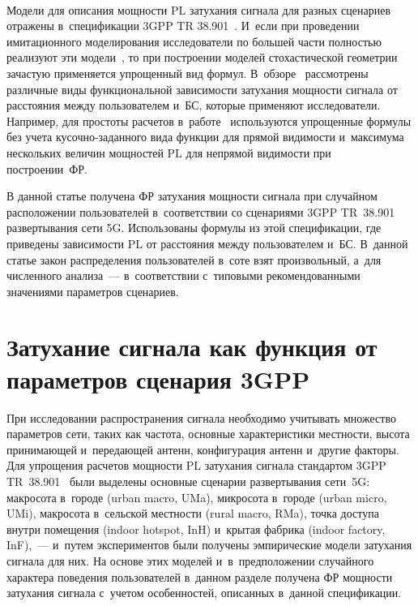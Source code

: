 \begin{multicols}{2}
\begin{figure*}[b] %
\vspace*{-6pt}
      \begin{center}
     \mbox{%
\epsfxsize=124.62mm 
}
\end{center}
\vspace*{-9pt}
\label{fig1}
\end{figure*}

Модели для описания мощности $\mathrm{PL}$ затухания сигнала для разных сценариев 
отражены в~спецификации 3GPP TR 38.901~\cite{3GPP38901}. И~если при проведении 
имитационного моделирования исследователи по большей части полностью реализуют 
эти модели~\cite{Bolla2023}, то при построении моделей стохастической гео\-мет\-рии 
зачастую применяется упрощенный вид формул.
В~обзоре~\cite{Hmamouche2021} рассмотрены различные виды функциональной 
зависимости затухания мощ\-ности сигнала от расстояния между пользователем 
и~БС, которые применяют исследователи. Например, для простоты 
расчетов в~работе~\cite{Moltchanov2022b} используются упрощенные формулы без 
учета ку\-соч\-но-за\-дан\-но\-го вида функции для прямой видимости и~максимума нескольких 
величин мощностей PL для непрямой видимости при по\-стро\-ении~ФР.

В данной статье получена ФР затухания мощ\-ности сигнала при случайном 
расположении пользователей в~соответствии со сценариями 3GPP TR~38.901 
развертывания сети 5G. Использованы формулы из этой спецификации, где приведены 
зависимости PL от расстояния между пользователем и~БС. В~данной 
статье закон распределения пользователей в~соте взят произвольный, а~для 
численного анализа~--- в~соответствии с~типовыми рекомендованными значениями 
параметров сценариев.



\section{Затухание сигнала как функция от параметров сценария 3GPP} \label{sec2}

При исследовании распространения сигнала необходимо учитывать множество 
параметров сети, таких как частота, основные характеристики местности, высота 
принимающей и~передающей антенн, конфигурация антенн и~другие факторы. Для 
упрощения расчетов мощности PL затухания сигнала стандартом 3GPP TR~38.901~\cite{3GPP38901} 
были выделены основные сценарии развертывания сети~5G: 
мак\-ро\-со\-та в~городе (urban macro, UMa), микросота в~городе (urban micro, UMi), 
мак\-ро\-со\-та в~сельской местности (rural macro, RMa), точка доступа внут\-ри 
помещения (indoor hotspot, InH) и~крытая фабрика (indoor factory, InF),~--- 
и~путем экспериментов были получены эмпирические модели затухания сигнала для них. 
На основе этих моделей и~в~предположении случайного характера поведения 
пользователей в~данном разделе получена ФР мощности затухания сигнала с~учетом 
особенностей, описанных в~данной спецификации.



\end{multicols}
